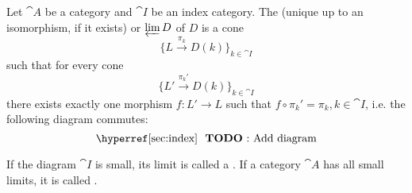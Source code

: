 \begin{definition}\label{def:categorical_limit}\mcite\cite[def. 5.1.19(b), 6.3.6]{Leinster2016Basic}
  Let \( \cat{A} \) be a category and \( \cat{I} \) be an index category. The (unique up to an isomorphism, if it exists)  or  \( \varprojlim D \) of \( D \) is a cone
  \begin{equation*}
    \{ L \overset {\pi_k} \to D(k) \}_{k \in \cat{I}}
  \end{equation*}
  such that for every cone
  \begin{equation*}
    \{ L' \overset {\pi_k'} \to D(k) \}_{k \in \cat{I}}
  \end{equation*}
  there exists exactly one morphism \( f: L' \to L \) such that \( f \circ \pi_k' = \pi_k, k \in \cat{I} \), i.e. the following diagram commutes:
  \begin{equation*}
    \text{\todo{Add diagram}}\iffalse\begin{mplibcode}
      beginfig(1);
      input metapost/graphs;

      v1 := thelabel("$D(k)$", origin);
      v2 := thelabel("$L'$", (-1, 1) scaled u);
      v3 := thelabel("$L$", (1, 1) scaled u);

      a1 := straight_arc(v2, v1);
      a2 := straight_arc(v3, v1);

      d1 := straight_arc(v2, v3);

      draw_vertices(v);
      draw_arcs(a);

      drawarrow d1 dotted;

      label.llft("$\pi_k$", straight_arc_midpoint of a1);
      label.lrt("$\pi_k'$", straight_arc_midpoint of a2);
      label.top("$f$", straight_arc_midpoint of d1);
      endfig;
    \end{mplibcode}\fi
  \end{equation*}

  If the diagram \( \cat{I} \) is small, its limit is called a . If a category \( \cat{A} \) has all small limits, it is called .
\end{definition}

